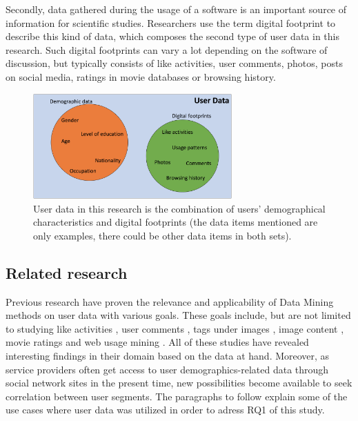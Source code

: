 Secondly, data gathered during the usage of a software is an important source of information for scientific studies. Researchers use the term digital footprint \cite{youyou2015computer} to describe this kind of data, which composes the second type of user data in this research. Such digital footprints can vary a lot depending on the software of discussion, but typically consists of like activities, user comments, photos, posts on social media, ratings in movie databases or browsing history. 

\begin{figure}[h] 
  \begin{center}
    \includegraphics[width=3in]{Images/user_data_venn.png}
    \caption{User data in this research is the combination of users' demographical characteristics and digital footprints (the data items mentioned are only examples, there could be other data items in both sets).}
    \label{user_data_venn}
  \end{center}
\end{figure}

\subsection{Related research}
Previous research have proven the relevance and applicability of Data Mining methods on user data with various goals. These goals include, but are not limited to studying like activities \cite{jang2015noreciprocity, jang2016teensengagemorewithfewerphotos, ottoni2013ladies, guy2016whatsyourorganizationlike, jang2015no}, user comments \cite{jang2016teensengagemorewithfewerphotos}, tags under images \cite{jang2016teensengagemorewithfewerphotos}, image content \cite{hu2014we, bakhshi2014faces}, movie ratings \cite{saraee2004data, kabinsingha2012movie} and web usage mining \cite{webusagemining}. All of these studies have revealed interesting findings in their domain based on the data at hand. Moreover, as service providers often get access to user demographics-related data through social network sites in the present time, new possibilities become available to seek correlation between user segments. The paragraphs to follow explain some of the use cases where user data was utilized in order to adress RQ1 of this study.


